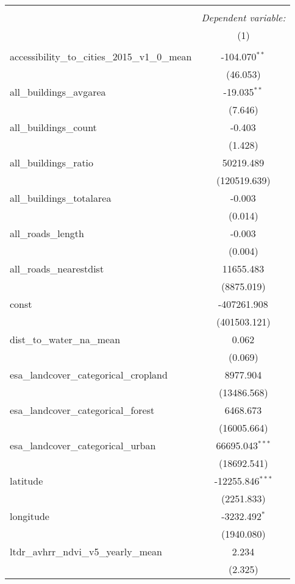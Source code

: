 \begin{table}[!htbp] \centering
\begin{tabular}{@{\extracolsep{5pt}}lc}
\\[-1.8ex]\hline
\hline \\[-1.8ex]
& \multicolumn{1}{c}{\textit{Dependent variable:}} \
\cr \cline{1-2}
\\[-1.8ex] & (1) \\
\hline \\[-1.8ex]
 accessibility_to_cities_2015_v1_0_mean & -104.070$^{**}$ \\
  & (46.053) \\
 all_buildings_avgarea & -19.035$^{**}$ \\
  & (7.646) \\
 all_buildings_count & -0.403$^{}$ \\
  & (1.428) \\
 all_buildings_ratio & 50219.489$^{}$ \\
  & (120519.639) \\
 all_buildings_totalarea & -0.003$^{}$ \\
  & (0.014) \\
 all_roads_length & -0.003$^{}$ \\
  & (0.004) \\
 all_roads_nearestdist & 11655.483$^{}$ \\
  & (8875.019) \\
 const & -407261.908$^{}$ \\
  & (401503.121) \\
 dist_to_water_na_mean & 0.062$^{}$ \\
  & (0.069) \\
 esa_landcover_categorical_cropland & 8977.904$^{}$ \\
  & (13486.568) \\
 esa_landcover_categorical_forest & 6468.673$^{}$ \\
  & (16005.664) \\
 esa_landcover_categorical_urban & 66695.043$^{***}$ \\
  & (18692.541) \\
 latitude & -12255.846$^{***}$ \\
  & (2251.833) \\
 longitude & -3232.492$^{*}$ \\
  & (1940.080) \\
 ltdr_avhrr_ndvi_v5_yearly_mean & 2.234$^{}$ \\
  & (2.325) \\

\end{tabular}
\end{table}
